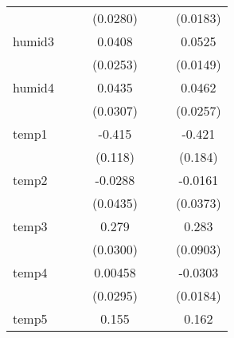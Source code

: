 {\begin{tabular}{l*{6}{c}}
            &                     &                     &    (0.0280)         &                     &                     &    (0.0183)         \\
[1em]
humid3      &                     &                     &      0.0408         &                     &                     &      0.0525\sym{**} \\
            &                     &                     &    (0.0253)         &                     &                     &    (0.0149)         \\
[1em]
humid4      &                     &                     &      0.0435         &                     &                     &      0.0462         \\
            &                     &                     &    (0.0307)         &                     &                     &    (0.0257)         \\
[1em]
temp1       &                     &                     &      -0.415\sym{**} &                     &                     &      -0.421\sym{*}  \\
            &                     &                     &     (0.118)         &                     &                     &     (0.184)         \\
[1em]
temp2       &                     &                     &     -0.0288         &                     &                     &     -0.0161         \\
            &                     &                     &    (0.0435)         &                     &                     &    (0.0373)         \\
[1em]
temp3       &                     &                     &       0.279\sym{***}&                     &                     &       0.283\sym{**} \\
            &                     &                     &    (0.0300)         &                     &                     &    (0.0903)         \\
[1em]
temp4       &                     &                     &     0.00458         &                     &                     &     -0.0303         \\
            &                     &                     &    (0.0295)         &                     &                     &    (0.0184)         \\
[1em]
temp5       &                     &                     &       0.155\sym{*}  &                     &                     &       0.162\sym{**} \\

\end{tabular}}
